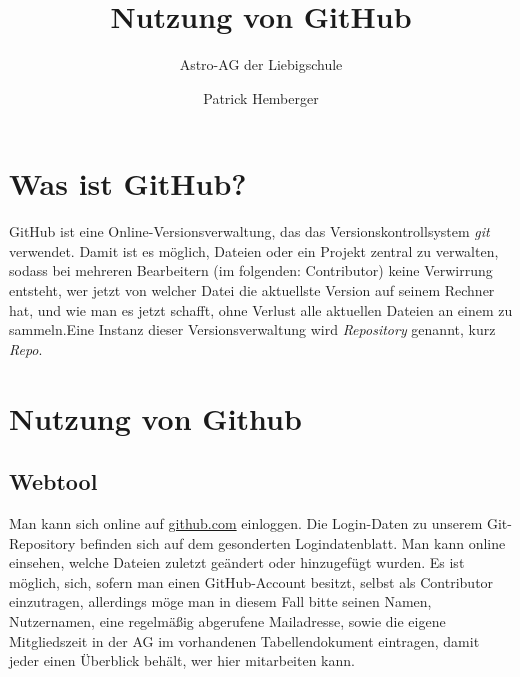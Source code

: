 \documentclass[12pt,a4paper,notitlepage,onecolumn,portrait,oneside, , , ]{scrartcl}
\begin{document}
\title{Nutzung von GitHub}
	\subtitle{Astro-AG der Liebigschule}
\author{Patrick Hemberger}

\maketitle

\section{Was ist GitHub?}
GitHub ist eine Online-Versionsverwaltung, das das Versionskontrollsystem \textit{git} verwendet. Damit ist es möglich, Dateien oder ein Projekt zentral zu verwalten, sodass bei mehreren Bearbeitern (im folgenden: Contributor) keine Verwirrung entsteht, wer jetzt von welcher Datei die aktuellste Version auf seinem Rechner hat, und wie man es jetzt schafft, ohne Verlust alle aktuellen Dateien an einem zu sammeln.Eine Instanz dieser Versionsverwaltung wird \textit{Repository} genannt, kurz \textit{Repo}.

\section{Nutzung von Github}
\subsection{Webtool}
Man kann sich online auf \url{github.com} einloggen. Die Login-Daten zu unserem Git-Repository befinden sich auf dem gesonderten Logindatenblatt. Man kann online einsehen, welche Dateien zuletzt geändert oder hinzugefügt wurden. Es ist möglich, sich, sofern man einen GitHub-Account besitzt, selbst als Contributor einzutragen, allerdings möge man in diesem Fall bitte seinen Namen, Nutzernamen, eine regelmäßig abgerufene Mailadresse, sowie die eigene Mitgliedszeit in der AG im vorhandenen Tabellendokument eintragen, damit jeder einen Überblick behält, wer hier mitarbeiten kann.
\end{document}
